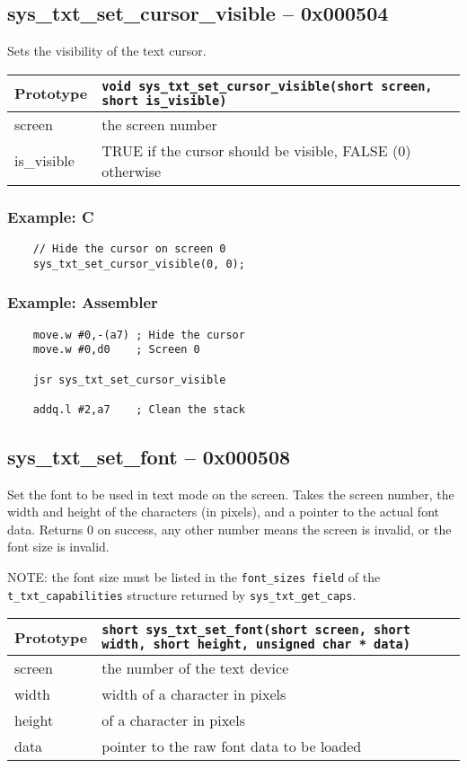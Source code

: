 \subsection*{sys\_txt\_set\_cursor\_visible -- 0x000504}
Sets the visibility of the text cursor.

\bigskip

\begin{tabular}{|l||l|} \hline
Prototype & \lstinline!void sys_txt_set_cursor_visible(short screen, short is_visible)! \\ \hline
screen & the screen number \\ \hline
is\_visible & TRUE if the cursor should be visible, FALSE (0) otherwise \\ \hline
\end{tabular}

\subsubsection*{Example: C}
\begin{lstlisting}
    // Hide the cursor on screen 0
    sys_txt_set_cursor_visible(0, 0);
\end{lstlisting}

\subsubsection*{Example: Assembler}
\begin{verbatim}
    move.w #0,-(a7) ; Hide the cursor
    move.w #0,d0    ; Screen 0

    jsr sys_txt_set_cursor_visible

    addq.l #2,a7    ; Clean the stack
\end{verbatim}


\subsection*{sys\_txt\_set\_font -- 0x000508}
Set the font to be used in text mode on the screen. Takes the screen number, the width and height of the characters (in pixels),
and a pointer to the actual font data. Returns 0 on success, any other number means the screen is invalid, or the font size is invalid.

NOTE: the font size must be listed in the \verb+font_sizes field+ of the \verb+t_txt_capabilities+ structure returned by \verb+sys_txt_get_caps+.

\bigskip

\begin{tabular}{|l||l|} \hline
Prototype & \lstinline!short sys_txt_set_font(short screen, short width, short height, unsigned char * data)! \\ \hline
screen & the number of the text device \\ \hline
width & width of a character in pixels \\ \hline
height & of a character in pixels \\ \hline
data & pointer to the raw font data to be loaded \\ \hline
\end{tabular}

